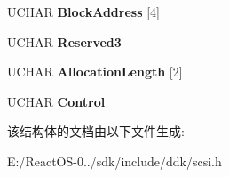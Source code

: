 \begin{DoxyCompactItemize}
U\+C\+H\+AR {\bfseries Block\+Address} \mbox{[}4\mbox{]}
\item 
\mbox{\label{struct___c_d_b_1_1___r_e_a_d___t_r_a_c_k___i_n_f_o_r_m_a_t_i_o_n_ad7aa64602afdd26ac304bf91bd6520b6}} 
U\+C\+H\+AR {\bfseries Reserved3}
\item 
\mbox{\label{struct___c_d_b_1_1___r_e_a_d___t_r_a_c_k___i_n_f_o_r_m_a_t_i_o_n_ae37f80f30df554d93110a9b3e370058e}} 
U\+C\+H\+AR {\bfseries Allocation\+Length} \mbox{[}2\mbox{]}
\item 
\mbox{\label{struct___c_d_b_1_1___r_e_a_d___t_r_a_c_k___i_n_f_o_r_m_a_t_i_o_n_ab9126a404a60d1b41dea8f06c1529307}} 
U\+C\+H\+AR {\bfseries Control}
\end{DoxyCompactItemize}


该结构体的文档由以下文件生成\+:\begin{DoxyCompactItemize}
\item 
E\+:/\+React\+O\+S-\/0../sdk/include/ddk/scsi.\+h\end{DoxyCompactItemize}
